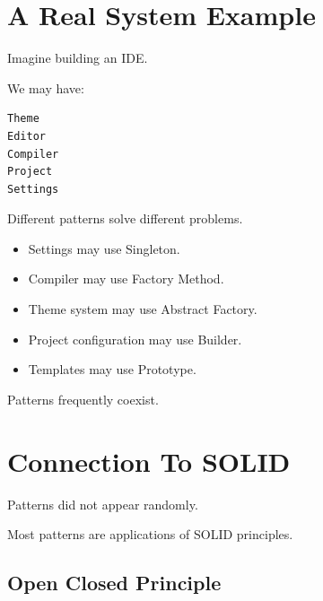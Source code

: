 \documentclass[11pt,a4paper]{book}
\begin{document}

\section{A Real System Example}

Imagine building an IDE.

We may have:

\begin{verbatim}
Theme
Editor
Compiler
Project
Settings
\end{verbatim}

Different patterns solve different problems.

\begin{itemize}

\item Settings may use Singleton.

\item Compiler may use Factory Method.

\item Theme system may use Abstract Factory.

\item Project configuration may use Builder.

\item Templates may use Prototype.

\end{itemize}

Patterns frequently coexist.


\section{Connection To SOLID}

\begin{idea}

Patterns did not appear randomly.

Most patterns are applications of SOLID principles.

\end{idea}


\subsection*{Open Closed Principle}
\end{document}
